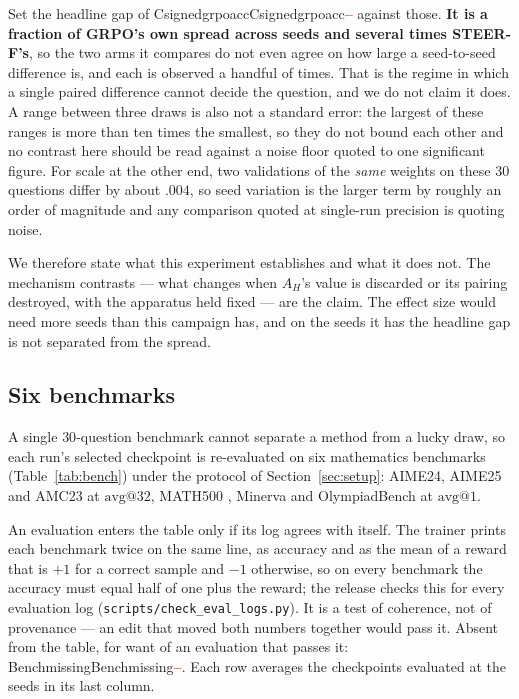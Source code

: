 \documentclass[11pt]{article}
\newcommand{\AH}{A_{H}}
\providecommand{\PENDING}{\textcolor{red}{\textbf{--}}}
\newcommand{\num}[1]{\ifcsname #1\endcsname\csname #1\endcsname\else\PENDING\fi}
\begin{document}
Set the headline gap of \num{Csignedgrpoacc} against those. \textbf{It is a fraction
of GRPO's own spread across seeds and several times STEER-F's}, so the two arms it
compares do not even agree on how large a seed-to-seed difference is, and each is
observed a handful of times. That is the regime in which a single paired difference
cannot decide the question, and we do not claim it does. A range between three draws
is also not a standard error: the largest of these ranges is more than ten times the
smallest, so they do not bound each other and no contrast here should be read against
a noise floor quoted to one significant figure. For scale at the other end,
two validations of the \emph{same} weights on these $30$ questions differ by about
$.004$, so seed variation is the larger term by roughly an order of magnitude and
any comparison quoted at single-run precision is quoting noise.

We therefore state what this experiment establishes and what it does not. The
mechanism contrasts --- what changes when $\AH$'s value is discarded or its pairing
destroyed, with the apparatus held fixed --- are the claim. The effect size would need more seeds than
this campaign has, and on the seeds it has the headline gap is not separated from
the spread.

\subsection{Six benchmarks}
\label{sec:res:bench}

A single $30$-question benchmark cannot separate a method from a lucky draw, so each
run's selected checkpoint is re-evaluated on six mathematics benchmarks
(Table~\ref{tab:bench}) under the protocol of Section~\ref{sec:setup}: AIME24, AIME25
and AMC23 at $\mathrm{avg@}32$, MATH500 \citep{hendrycks2021measuring,lightman2024lets}, Minerva
\citep{lewkowycz2022solving} and OlympiadBench \citep{he2024olympiadbench} at
$\mathrm{avg@}1$.

An evaluation enters the table only if its log agrees with itself. The trainer prints
each benchmark twice on the same line, as accuracy and as the mean of a reward that is
$+1$ for a correct sample and $-1$ otherwise, so on every benchmark the accuracy must
equal half of one plus the reward; the release checks this for every evaluation log
(\texttt{scripts/check\_eval\_logs.py}). It is a test of coherence, not of provenance
--- an edit that moved both numbers together would pass it. Absent from the table,
for want of an evaluation that passes it: \num{Benchmissing}. Each row averages the
checkpoints evaluated at the seeds in its last column.
\end{document}
